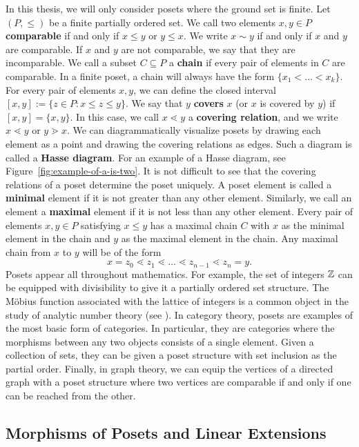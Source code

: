\documentclass{puthesis-UG}
\begin{document}
In this thesis, we will only consider posets where the ground set is finite. Let $(P, \leq)$ be a finite partially ordered set. We call two elements $x, y \in P$ \textbf{comparable} if and only if $x \leq y$ or $y \leq x$. We write $x \sim y$ if and only if $x$ and $y$ are comparable. If $x$ and $y$ are not comparable, we say that they are incomparable. We call a subset $C \subseteq P$ a \textbf{chain} if every pair of elements in $C$ are comparable. In a finite poset, a chain will always have the form $\{x_1 < \ldots < x_k\}$. For every pair of elements $x, y$, we can define the closed interval $[x, y] := \{z \in P : x \leq z \leq y\}$. We say that $y$ \textbf{covers} $x$ (or $x$ is covered by $y$) if $[x, y] = \{x, y\}$. In this case, we call $x \lessdot y$ a \textbf{covering relation}, and we write $x \lessdot y$ or $y \gtrdot x$. We can diagrammatically visualize posets by drawing each element as a point and drawing the covering relations as edges. Such a diagram is called a \textbf{Hasse diagram}. For an example of a Hasse diagram, see Figure~\ref{fig:example-of-a-is-two}. It is not difficult to see that the covering relations of a poset determine the poset uniquely. A poset element is called a \textbf{minimal} element if it is not greater than any other element. Similarly, we call an element a \textbf{maximal} element if it is not less than any other element. Every pair of elements $x, y \in P$ satisfying $x \leq y$ has a maximal chain $C$ with $x$ as the minimal element in the chain and $y$ as the maximal element in the chain. Any maximal chain from $x$ to $y$ will be of the form 
\[
	x = z_0 \lessdot z_1 \lessdot \ldots \lessdot z_{n-1} \lessdot z_n = y. 
\]
Posets appear all throughout mathematics. For example, the set of integers $\mathbb{Z}$ can be equipped with divisibility to give it a partially ordered set structure. The M\"obius function associated with the lattice of integers is a common object in the study of analytic number theory (see \cite{Apostol2013-an}). In category theory, posets are examples of the most basic form of categories. In particular, they are categories where the morphisms between any two objects consists of a single element. Given a collection of sets, they can be given a poset structure with set inclusion as the partial order. Finally, in graph theory, we can equip the vertices of a directed graph with a poset structure where two vertices are comparable if and only if one can be reached from the other. 

\subsection{Morphisms of Posets and Linear Extensions}
\end{document}
